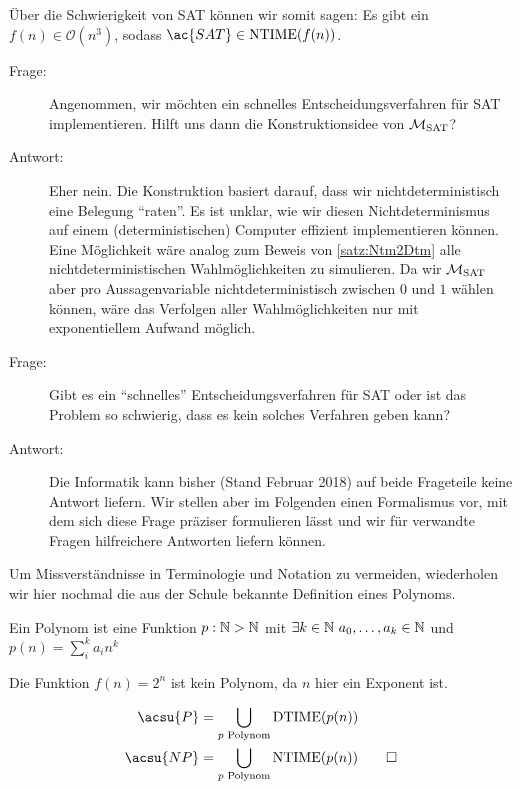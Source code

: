 Über die Schwierigkeit von \ac{SAT} können wir somit sagen:
Es gibt ein $f(n)\in\mathcal{O}(n^3)$, sodass $\ac{SAT}\in\NTIME(f(n))$.



\begin{description}
 \item[Frage:] Angenommen, wir möchten ein schnelles Entscheidungsverfahren für \ac{SAT} implementieren.
Hilft uns dann die Konstruktionsidee von $\mathcal{M}_\text{SAT}$?
 \item[Antwort:] Eher nein. 
Die Konstruktion basiert darauf, dass wir nichtdeterministisch eine Belegung "`raten"'.
Es ist unklar, wie wir diesen Nichtdeterminismus auf einem (deterministischen) Computer effizient implementieren können.
Eine Möglichkeit wäre analog zum Beweis von \autoref{satz:Ntm2Dtm} alle nichtdeterministischen Wahlmöglichkeiten zu simulieren.
Da wir $\mathcal{M}_\text{SAT}$ aber pro Aussagenvariable nichtdeterministisch zwischen $0$ und $1$ wählen können, wäre das Verfolgen aller Wahlmöglichkeiten nur mit exponentiellem Aufwand möglich.
\end{description}

\begin{description}
 \item[Frage:] Gibt es ein "`schnelles"' Entscheidungsverfahren für \ac{SAT} oder ist das Problem so schwierig, dass es kein solches Verfahren geben kann?
 \item[Antwort:] Die Informatik kann bisher (Stand Februar 2018) auf beide Frageteile keine Antwort liefern. 
 Wir stellen aber im Folgenden einen Formalismus vor, mit dem sich diese Frage präziser formulieren lässt und wir für verwandte Fragen hilfreichere Antworten liefern können.
\end{description}


Um Missverständnisse in Terminologie und Notation zu vermeiden, wiederholen wir hier nochmal die aus der Schule bekannte Definition eines Polynoms.

\begin{Def}[name={[Polynom]}]
	Ein Polynom ist eine Funktion $p:\mathbb{N}\->\mathbb{N}$ mit $\exists k\in \mathbb{N}\ a_0,\dots,a_k\in\mathbb{N}$ und \mbox{$p(n)=\sum_i^k a_in^k$}
\end{Def}
\begin{Bemerkung}
 Die Funktion $f(n)=2^n$ ist kein Polynom, da $n$ hier ein Exponent ist.
\end{Bemerkung}

\begin{Def}
 \begin{align*}
  \acsu{P} &= \bigcup_{p\text{ Polynom}} \DTIME(p(n)) \\
  \acsu{NP} &= \bigcup_{p\text{ Polynom}} \NTIME(p(n))
  \qedhere
 \end{align*}
\end{Def}

